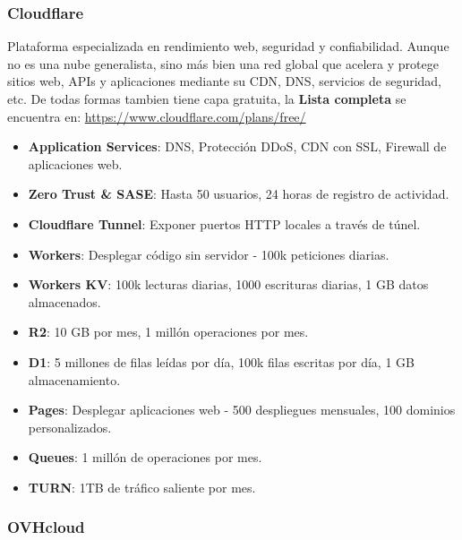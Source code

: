\subsubsection*{Cloudflare}

Plataforma especializada en rendimiento web, seguridad y confiabilidad. Aunque no es una nube generalista, sino más bien una red global que acelera y protege sitios web, APIs y aplicaciones mediante su CDN, DNS, servicios de seguridad, etc. De todas formas tambien tiene capa gratuita, la \textbf{Lista completa} se encuentra en: \url{https://www.cloudflare.com/plans/free/}

\begin{itemize}
	\item \textbf{Application Services}: DNS, Protección DDoS, CDN con SSL, Firewall de aplicaciones web.
	\item \textbf{Zero Trust \& SASE}: Hasta 50 usuarios, 24 horas de registro de actividad.
	\item \textbf{Cloudflare Tunnel}: Exponer puertos HTTP locales a través de túnel.
	\item \textbf{Workers}: Desplegar código sin servidor - 100k peticiones diarias.
	\item \textbf{Workers KV}: 100k lecturas diarias, 1000 escrituras diarias, 1 GB datos almacenados.
	\item \textbf{R2}: 10 GB por mes, 1 millón operaciones por mes.
	\item \textbf{D1}: 5 millones de filas leídas por día, 100k filas escritas por día, 1 GB almacenamiento.
	\item \textbf{Pages}: Desplegar aplicaciones web - 500 despliegues mensuales, 100 dominios personalizados.
	\item \textbf{Queues}: 1 millón de operaciones por mes.
	\item \textbf{TURN}: 1TB de tráfico saliente por mes.
\end{itemize}

\subsubsection*{OVHcloud}

